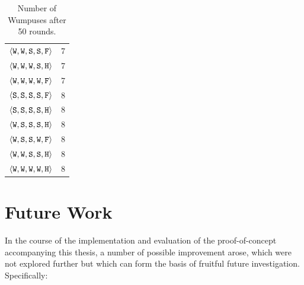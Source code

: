 \begin{table}
{{\begin{minipage}[b]{0.42\hsize}
\begin{tabular}{ l | c }
					$\langle \mathtt{W},\mathtt{W}, \mathtt{S}, \mathtt{S}, \mathtt{F} \rangle$ & 7\\
					$\langle \mathtt{W},\mathtt{W}, \mathtt{W}, \mathtt{S}, \mathtt{H} \rangle$ & 7\\
					$\langle \mathtt{W},\mathtt{W}, \mathtt{W}, \mathtt{W}, \mathtt{F} \rangle$ & 7\\
					$\langle \mathtt{S},\mathtt{S}, \mathtt{S}, \mathtt{S}, \mathtt{F} \rangle$ & 8\\
					$\langle \mathtt{S},\mathtt{S}, \mathtt{S}, \mathtt{S}, \mathtt{H} \rangle$ & 8\\
					$\langle \mathtt{W},\mathtt{S}, \mathtt{S}, \mathtt{S}, \mathtt{H} \rangle$ & 8\\
					$\langle \mathtt{W},\mathtt{S}, \mathtt{S}, \mathtt{W}, \mathtt{F} \rangle$ & 8\\
					$\langle \mathtt{W},\mathtt{W}, \mathtt{S}, \mathtt{S}, \mathtt{H} \rangle$ & 8\\
					$\langle \mathtt{W},\mathtt{W}, \mathtt{W}, \mathtt{W}, \mathtt{H} \rangle$ & 8\\
				\end{tabular}
				\caption{Number of Wumpuses after 50 rounds.}
				\label{tab:numWumpuses}
			\end{minipage}
			\hfill
		}}
	\end{table}

\section{Future Work}\label{sec:futureWork}

In the course of the implementation and evaluation of the proof-of-concept accompanying this thesis, a number of possible improvement arose, which were not explored further but which can form the basis of fruitful future investigation. Specifically:

